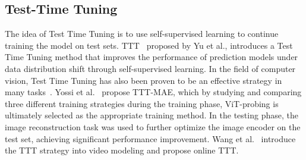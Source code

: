 \subsection{Test-Time Tuning} \label{subsec:ttt} 
The idea of Test Time Tuning is to use self-supervised learning to continue training the model on test sets. 
TTT~\cite{sun2020test} proposed by Yu et al., introduces a Test Time Tuning method that improves the performance of prediction models under data distribution shift through self-supervised learning.
In the field of computer vision, Test Time Tuning has also been proven to be an effective strategy in many tasks~\cite{jain2011online, mullapudi2019online, nitzan2022mystyle, shocher2018zero, tonioni2019learning, tonioni2019real, zhang2020online, zhong2017recovery, zhong2018open}. 
Yossi et al.~\cite{gandelsman2022test} propose TTT-MAE, which by studying and comparing three different training strategies during the training phase, ViT-probing is ultimately selected as the appropriate training method. In the testing phase, the image reconstruction task was used to further optimize the image encoder on the test set, achieving significant performance improvement.
Wang et al.~\cite{wang2023test} introduce the TTT strategy into video modeling and propose online TTT. 
